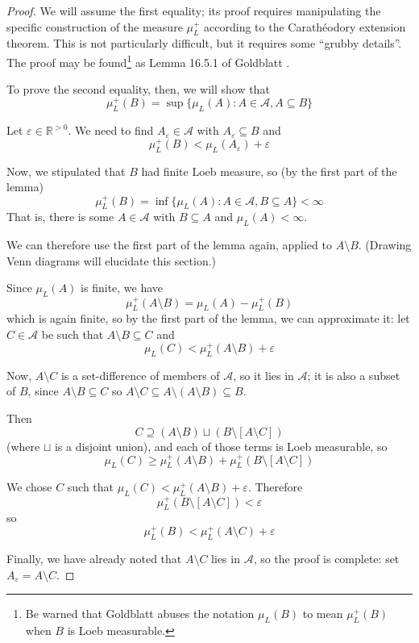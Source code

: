 \documentclass[11pt]{amsart}
\theoremstyle{remark}
\newcommand{\disjointunion}{\sqcup}
\begin{document}
\begin{proof}
We will assume the first equality; its proof requires manipulating the specific construction of the measure $\mu_L^+$ according to the Carath\'eodory extension theorem.
This is not particularly difficult, but it requires some ``grubby details''.
The proof may be found\footnote{Be warned that Goldblatt abuses the notation $\mu_L(B)$ to mean $\mu_L^+(B)$ when $B$ is Loeb measurable.} as Lemma 16.5.1 of Goldblatt \cite{goldblatt}.

To prove the second equality, then, we will show that $$\mu_L^+(B) = \sup \{ \mu_L(A) : A \in \mathcal{A}, A \subseteq B \}$$

Let $\varepsilon \in \mathbb{R}^{>0}$.
We need to find $A_{\varepsilon} \in \mathcal{A}$ with $A_{\varepsilon} \subseteq B$ and $$\mu_L^+(B) < \mu_L(A_{\varepsilon}) + \varepsilon$$

Now, we stipulated that $B$ had finite Loeb measure, so (by the first part of the lemma) $$\mu_L^+(B) = \inf \{ \mu_L(A) : A \in \mathcal{A}, B \subseteq A \} < \infty$$
That is, there is some $A \in \mathcal{A}$ with $B \subseteq A$ and $\mu_L(A) < \infty$.

We can therefore use the first part of the lemma again, applied to $A \setminus B$.
(Drawing Venn diagrams will elucidate this section.)

Since $\mu_L(A)$ is finite, we have $$\mu_L^+(A \setminus B) = \mu_L(A) - \mu_L^+(B)$$
which is again finite, so by the first part of the lemma, we can approximate it: let $C \in \mathcal{A}$ be such that $A \setminus B \subseteq C$ and $$\mu_L(C) < \mu_L^+(A \setminus B) + \varepsilon$$

Now, $A \setminus C$ is a set-difference of members of $\mathcal{A}$, so it lies in $\mathcal{A}$; it is also a subset of $B$, since $A \setminus B \subseteq C$ so $A \setminus C \subseteq A \setminus (A \setminus B) \subseteq B$.

Then $$C \supseteq (A \setminus B) \disjointunion (B \setminus [A \setminus C])$$ (where $\disjointunion$ is a disjoint union), and each of those terms is Loeb measurable, so $$\mu_L(C) \geq \mu_L^+(A \setminus B) + \mu_L^+(B \setminus [A \setminus C])$$

We chose $C$ such that $\mu_L(C) < \mu_L^+(A \setminus B) + \varepsilon$.
Therefore $$\mu_L^+(B \setminus [A \setminus C]) < \varepsilon$$
so $$\mu_L^+(B) < \mu_L^+(A \setminus C) + \varepsilon$$

Finally, we have already noted that $A \setminus C$ lies in $\mathcal{A}$, so the proof is complete: set $A_{\varepsilon} = A \setminus C$.
\end{proof}
\end{document}
